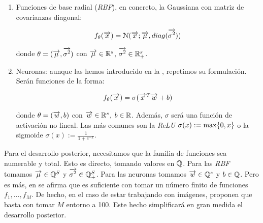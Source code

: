 \begin{enumerate}
    \item Funciones de base radial (\textit{RBF}), en concreto, la Gaussiana con matriz de covarianzas diagonal:

	      \begin{equation}
		      f_\theta(\overrightarrow{x}) = \mathcal{N}(\overrightarrow{x}; \overrightarrow{\mu}, diag(\overrightarrow{\sigma^2}))
	      \end{equation}

          donde $\theta = (\overrightarrow{\mu}, \overrightarrow{\sigma^2})$ con $\overrightarrow{\mu} \in \mathbb{R}^s$, $\overrightarrow{\sigma^2} \in \mathbb{R}^s_+$.

      \item Neuronas: aunque las hemos introducido en la  , repetimos su formulación. Serán funciones de la forma:

        \begin{equation}
        \begin{split}
            & f_\theta(\overrightarrow{x}) = \sigma(\overrightarrow{x}^T \overrightarrow{w} + b) \\
        \end{split}
        \end{equation}

        donde $\theta = (\overrightarrow{w}, b)$ con $\overrightarrow{w} \in \mathbb{R}^s$, $b \in \mathbb{R}$. Además, $\sigma$ será una función de activación no lineal. Las más comunes son la \textit{ReLU} $\sigma(x) := \max \{ 0, x \}$ o la sigmoide $\sigma(x) := \frac{1}{1 + e^{-x}}$.
\end{enumerate}

Para el desarrollo posterior, necesitamos que la familia de funciones sea numerable y total. Esto es directo, tomando valores en $ \mathbb{Q}$. Para las \textit{RBF} tomamos $\overrightarrow{\mu} \in \mathbb{Q}^S$ y $\overrightarrow{\sigma^2} \in \mathbb{Q}^S_+$. Para las neuronas tomamos $\overrightarrow{w} \in \mathbb{Q}^s$ y $b \in \mathbb{Q}$.  Pero es más, en \cite{matematicas:principal} se afirma que es suficiente con tomar un número finito de funciones ${f_1, \ldots, f_M}$. De hecho, en el caso de estar trabajando con imágenes, proponen que basta con tomar $M$ entorno a 100. Este hecho simplificará en gran medida el desarrollo posterior.
